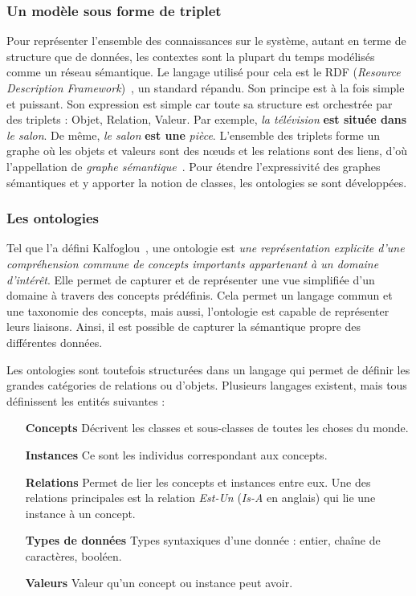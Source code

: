 \subsubsection{Un modèle sous forme de triplet}
Pour représenter l'ensemble des connaissances sur le système, autant en terme de structure que de données, les contextes sont la plupart du temps modélisés comme un réseau sémantique. Le langage utilisé pour cela est le RDF (\textit{Resource Description Framework})~\cite{W3C:RDF}, un standard répandu. Son principe est à la fois simple et puissant. Son expression est simple car toute sa structure est orchestrée par des triplets : Objet, Relation, Valeur. Par exemple, \textit{la télévision} \textbf{est située dans} \textit{le salon}. De même, \textit{le salon} \textbf{est une} \textit{pièce}. L'ensemble des triplets forme un graphe où les objets et valeurs sont des nœuds et les relations sont des liens, d'où l'appellation de \textit{graphe sémantique}~\cite{Minsky:knowledge}. Pour étendre l'expressivité des graphes sémantiques et y apporter la notion de classes, les ontologies se sont développées.

\subsubsection{Les ontologies}
Tel que l'a défini Kalfoglou~\cite{Kalfoglou:ontology}, une ontologie est \textit{une représentation explicite d'une compréhension commune de concepts importants appartenant à un domaine d'intérêt}.
Elle permet de capturer et de représenter une vue simplifiée d'un domaine à travers des concepts prédéfinis. Cela permet un langage commun et une taxonomie des concepts, mais aussi, l'ontologie est capable de représenter leurs liaisons. Ainsi, il est possible de capturer la sémantique propre des différentes données.

Les ontologies sont toutefois structurées dans un langage qui permet de définir les grandes catégories de relations ou d'objets. Plusieurs langages existent, mais tous définissent les entités suivantes :
\begin{itemize}
    \item[\textbf{Concepts}] Décrivent les classes et sous-classes de toutes les choses du monde.
    \item[\textbf{Instances}] Ce sont les individus correspondant aux concepts.
    \item[\textbf{Relations}] Permet de lier les concepts et instances entre eux. Une des relations principales est la relation \textit{Est-Un} (\textit{Is-A} en anglais) qui lie une instance à un concept.
    \item[\textbf{Types de données}] Types syntaxiques d'une donnée : entier, chaîne de caractères, booléen.
    \item[\textbf{Valeurs}] Valeur qu'un concept ou instance peut avoir.
\end{itemize}

